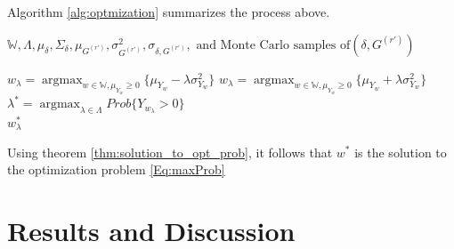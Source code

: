 \documentclass[12pt,oneside,a4paper]{book}
\theoremstyle{definition}
\theoremstyle{remark}
\DeclareMathOperator*{\argmax}{argmax}
\begin{document}
					Algorithm \ref{alg:optmization} summarizes the process above.


					\begin{algorithm}
						\caption{Optimization for the Problem }
						\label{alg:optmization}
						\begin{algorithmic}[1]
							\Require $\mathbb{W}, \Lambda, \mu_\delta, \Sigma_{\delta}, \mu_{G^(r')}, \sigma^2_{G^(r')}, \sigma_{\delta, G^{(r')}}, \text{ and Monte Carlo samples of} (\delta, G^{(r')})$

							\ForAll{ $\lambda \in  \Lambda$}
							\State $w_\lambda = \argmax_{w \in \mathbb{W}, \mu_{Y_w} \ge 0 } \{\mu_{Y_w} - \lambda\sigma^2_{Y_w}\}$
							\EndFor
							\Else
							\ForAll{ $\lambda \in  \Lambda$}
							\State $w_\lambda = \argmax_{w \in \mathbb{W}, \mu_{Y_w} \ge 0 } \{\mu_{Y_w} + \lambda\sigma^2_{Y_w}\}$
							\EndFor
							\EndIf
							\State  $\lambda^* = \argmax_{ \lambda \in \Lambda } Prob\{Y_{w_\lambda} > 0 \}$\\
							\Return $w_\lambda^*$
						\end{algorithmic}
					\end{algorithm}
			Using theorem \ref{thm:solution_to_opt_prob}, it follows that $w^*$ is the solution to the optimization problem \ref{Eq:maxProb}
			\chapter{Results and Discussion}




	
	
\end{document}
